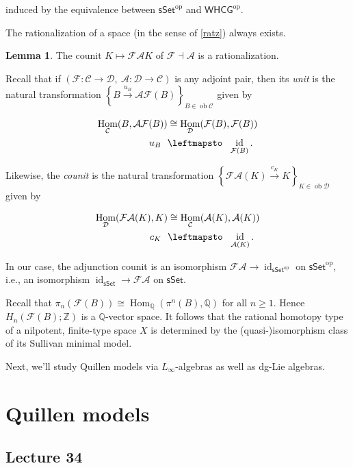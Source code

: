 \documentclass[10pt,letterpaper,cm]{nupset}
\theoremstyle{definition}
\theoremstyle{theorem}
\newtheorem{lemma}[defn]{Lemma}
\theoremstyle{remark}
\newcommand{\A}{\mathcal A}
\newcommand{\F}{\mathcal F}
\newcommand{\Q}{\mathbb Q}
\newcommand{\Z}{\mathbb Z}
\newcommand{\1}{\mathbb{1}}
\renewcommand{\c}{\mathcal{C}}
\renewcommand{\d}{\mathcal{D}}
\newcommand{\0}{\vec 0}
\DeclareMathOperator{\id}{id}
\DeclareMathOperator{\Hom}{Hom}
\DeclareMathOperator{\ob}{ob}
\DeclareMathOperator{\op}{op}
\begin{document}
induced by the equivalence between $\mathsf{sSet}^{\op}$ and $\mathsf{WHCG}^{\op}$.

\medskip

The rationalization of a space (in the sense of \cref{ratz}) always exists.

\begin{lemma}
The counit $K \mapsto \F{\A{K}}$ of $\F \dashv \A$ is a rationalization.
\end{lemma}

Recall that if $\left(\F : \c \to \d,\ \A : \d \to \c \right)$ is any adjoint pair, then its \textit{unit} is the natural transformation \linebreak $\left\{B \xrightarrow{u_B} \A{\F(B)}\right\}_{B \in \ob{\c}}$ given by

\begin{align*}
\Hom_{\c}(B, \A{\F(B)}) &  \cong \Hom_{\d}(\F(B), \F(B))
\\ u_B \ \ & \leftmapsto \ \ \id_{\F(B)}.
\end{align*}

Likewise, the \textit{counit} is the natural transformation $\left\{\F{\A(K)} \xrightarrow{c_K} K \right\}_{K \in \ob{\d}}$ given by

\begin{align*}
\Hom_{\d}(\F{\A(K)}, K) &  \cong \Hom_{\c}(\A(K), \A(K))
\\ c_K \ \ & \leftmapsto \ \ \id_{\A(K)}.
\end{align*}

In our case, the adjunction counit is an isomorphism $\F{\A} \to \id_{\mathsf{sSet}^{\op}}$ on $\mathsf{sSet}^{\op}$, i.e., an isomorphism $ \id_{\mathsf{sSet}} \to \F{\A} $ on $\mathsf{sSet}$.

\medskip

Recall that $\pi_n(\F(B)) \cong \Hom_{\Q}(\pi^n(B), \Q)$ for all $n \geq 1$. Hence $H_n(\F(B); \Z)$ is a $\Q$-vector space. It follows that the rational homotopy type of a nilpotent, finite-type space $X$ is determined by the (quasi-)isomorphism class of its Sullivan minimal model. 

\medskip

Next, we'll study Quillen models via $L_{\infty}$-algebras as well as dg-Lie algebras.

\section{Quillen models}

\subsection{Lecture 34}
\end{document}
